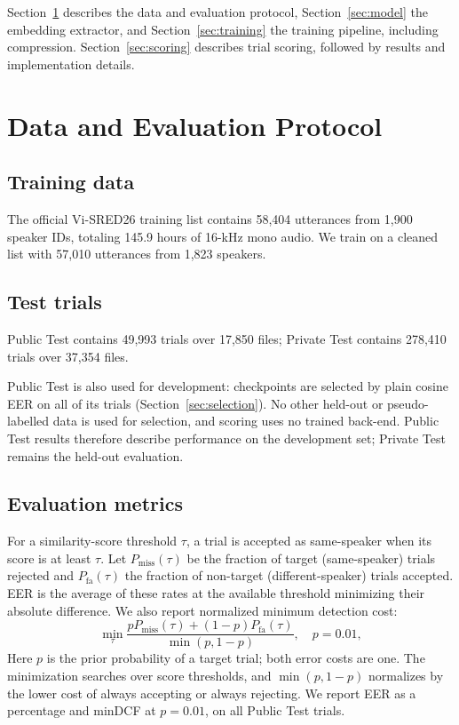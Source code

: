 \documentclass[11pt]{article}
\begin{document}
Section~\ref{sec:data} describes the data and evaluation protocol, Section~\ref{sec:model} the embedding extractor, and Section~\ref{sec:training} the training pipeline, including compression. Section~\ref{sec:scoring} describes trial scoring, followed by results and implementation details.

\section{Data and Evaluation Protocol}
\label{sec:data}
\subsection{Training data}
The official Vi-SRED26 training list contains 58,404 utterances from 1,900 speaker IDs, totaling 145.9 hours of 16-kHz mono audio. We train on a cleaned list with 57,010 utterances from 1,823 speakers.

\subsection{Test trials}
Public Test contains 49,993 trials over 17,850 files; Private Test contains 278,410 trials over 37,354 files.

Public Test is also used for development: checkpoints are selected by plain cosine EER on all of its trials (Section~\ref{sec:selection}). No other held-out or pseudo-labelled data is used for selection, and scoring uses no trained back-end. Public Test results therefore describe performance on the development set; Private Test remains the held-out evaluation.

\subsection{Evaluation metrics}
For a similarity-score threshold $\tau$, a trial is accepted as same-speaker when its score is at least $\tau$. Let $P_{\mathrm{miss}}(\tau)$ be the fraction of target (same-speaker) trials rejected and $P_{\mathrm{fa}}(\tau)$ the fraction of non-target (different-speaker) trials accepted. EER is the average of these rates at the available threshold minimizing their absolute difference. We also report normalized minimum detection cost:
\begin{equation}
 \min_\tau\frac{pP_{\mathrm{miss}}(\tau)+(1-p)P_{\mathrm{fa}}(\tau)}{\min(p,1-p)},\quad p=0.01,
\end{equation}
Here $p$ is the prior probability of a target trial; both error costs are one. The minimization searches over score thresholds, and $\min(p,1-p)$ normalizes by the lower cost of always accepting or always rejecting. We report EER as a percentage and minDCF at $p=0.01$, on all Public Test trials.
\end{document}
